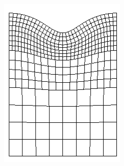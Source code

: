 \documentclass[11pt]{report}
\begin{document}
\begin{figure}[!htb]
\begin{center}
\begin{subfigure}[b]{0.22\textwidth}
		\includegraphics[width=\textwidth]{mesh/mesh_piece_const_10_9_1_med}
	\end{subfigure}
    \begin{subfigure}[b]{0.22\textwidth}

\end{subfigure}
\end{center}
\end{figure}
\end{document}
